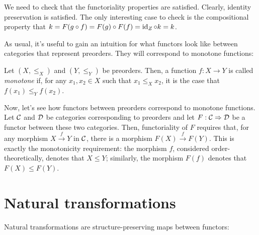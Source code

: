 We need to check that the functoriality properties are 
satisfied. Clearly, identity preservation is satisfied. The only interesting 
case to check is the compositional property that $k = F(g \circ f) = F(g) \circ F(f) = \operatorname{id}_Z \circ k = k$.

As usual, it's useful to gain an intuition for what functors look like 
between categories that represent preorders. They will correspond to 
monotone functions:

\begin{definition}
  Let $(X, \le_X)$ and $(Y, \le_Y)$ be preorders. Then, a 
  function $f : X \to Y$ is called \emph{monotone} if, 
  for any $x_1, x_2 \in X$ such that $x_1 \le_X x_2$, 
  it is the case that $f(x_1) \le_Y f(x_2)$.
\end{definition}

Now, let's see how functors between preorders correspond to monotone 
functions. 
Let $\mathcal C$ and $\mathcal D$ be categories corresponding to preorders
and let $F : \mathcal C \Rightarrow \mathcal D$ be a functor between 
these two categories.
Then, functoriality of $F$ requires that,
for any morphism $X \xrightarrow{f} Y$ in $\mathcal C$, 
there is a morphism $F(X) \xrightarrow{f} F(Y)$.
This is exactly the monotonicity requirement:
the morphism $f$, considered order-theoretically, 
denotes that $X \le Y$; similarly, the morphism $F(f)$ 
denotes that $F(X) \le F(Y)$.





\section{Natural transformations}
Natural transformations are structure-preserving maps between functors:

